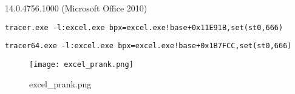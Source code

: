  14.0.4756.1000 (Microsoft Office 2010)

\begin{lstlisting}
tracer.exe -l:excel.exe bpx=excel.exe!base+0x11E91B,set(st0,666)
\end{lstlisting}

\begin{lstlisting}
tracer64.exe -l:excel.exe bpx=excel.exe!base+0x1B7FCC,set(st0,666)
\end{lstlisting}


\begin{figure}[ht!]
\centering
\texttt{[image: excel\_prank.png]}
\caption{excel\_prank.png}
\end{figure}

